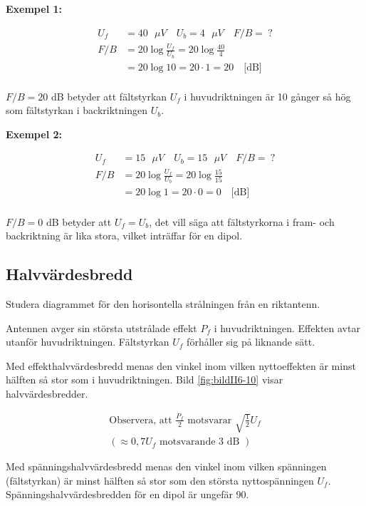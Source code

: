 \textbf{Exempel 1:}

\begin{align*}
  U_f &= 40 \text{ \(\mu V\)} \quad U_b = 4\text{ \(\mu V\)} \quad F/B =\ ? \\
  F/B &= 20 \log\frac{U_f}{U_b} = 20 \log\frac{40}{4} \\
  &= 20 \log 10 = 20 \cdot 1 = 20 \quad \text{[dB]} \\
\end{align*}

\(F/B = 20\) dB betyder att fältstyrkan \(U_f\) i huvudriktningen är
10 gånger så hög som fältstyrkan i backriktningen \(U_b\).

\textbf{Exempel 2:}

\begin{align*}
  U_f &= 15 \text{ \(\mu V\)} \quad U_b = 15\text{ \(\mu V\)} \quad F/B =\ ? \\
  F/B &= 20 \log\frac{U_f}{U_b} = 20 \log\frac{15}{15} \\
  &= 20 \log 1 = 20 \cdot 0 = 0 \quad \text{[dB]} \\
\end{align*}

\(F/B = 0\) dB betyder att \(U_f = U_b\), det vill säga att fältstyrkorna i
fram- och backriktning är lika stora, vilket inträffar för en dipol.

\subsection{Halvvärdesbredd}

Studera diagrammet för den horisontella strålningen från en riktantenn.

Antennen avger sin största utstrålade effekt \(P_f\) i huvudriktningen.
Effekten avtar utanför huvudriktningen.
Fältstyrkan \(U_f\) förhåller sig på liknande sätt.

Med effekthalvvärdesbredd menas den vinkel inom vilken nyttoeffekten
är minst hälften så stor som i huvudriktningen.
Bild \ref{fig:bildII6-10} visar halvvärdesbredder.

\begin{gather*}
  \text{Observera, att } \frac{P_f}{2} \text{ motsvarar }
  \sqrt{\frac{1}{2}}U_f \\
  ( \approx 0,7 U_f \text{ motsvarande 3 dB })
\end{gather*}

Med spänningshalvvärdesbredd menas den vinkel inom vilken spänningen
(fältstyrkan) är minst hälften så stor som den största nyttospänningen \(U_f\).
Spänningshalvvärdesbredden för en dipol är ungefär 90\degree.


